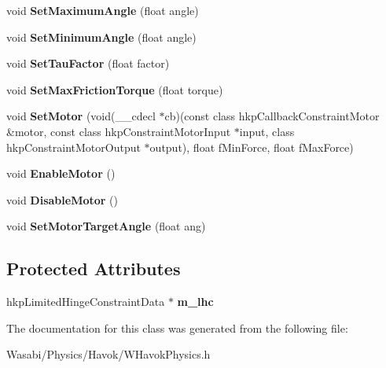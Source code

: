 \begin{DoxyCompactItemize}
\item 
void {\bfseries Set\+Maximum\+Angle} (float angle)\hypertarget{class_w_limited_hinge_a46782450f40d6a23b24eb43ba095c912}{}\label{class_w_limited_hinge_a46782450f40d6a23b24eb43ba095c912}

\item 
void {\bfseries Set\+Minimum\+Angle} (float angle)\hypertarget{class_w_limited_hinge_a5259add02a20a4f8fa0f758cc7bf2e76}{}\label{class_w_limited_hinge_a5259add02a20a4f8fa0f758cc7bf2e76}

\item 
void {\bfseries Set\+Tau\+Factor} (float factor)\hypertarget{class_w_limited_hinge_a75d6917491789b4929828ed719f40f0f}{}\label{class_w_limited_hinge_a75d6917491789b4929828ed719f40f0f}

\item 
void {\bfseries Set\+Max\+Friction\+Torque} (float torque)\hypertarget{class_w_limited_hinge_aa304dee708fe9be400088d3f9acedbc2}{}\label{class_w_limited_hinge_aa304dee708fe9be400088d3f9acedbc2}

\item 
void {\bfseries Set\+Motor} (void(\+\_\+\+\_\+cdecl $\ast$cb)(const class hkp\+Callback\+Constraint\+Motor \&motor, const class hkp\+Constraint\+Motor\+Input $\ast$input, class hkp\+Constraint\+Motor\+Output $\ast$output), float f\+Min\+Force, float f\+Max\+Force)\hypertarget{class_w_limited_hinge_a4c05bb7a53ef80e5505afc613599eb81}{}\label{class_w_limited_hinge_a4c05bb7a53ef80e5505afc613599eb81}

\item 
void {\bfseries Enable\+Motor} ()\hypertarget{class_w_limited_hinge_af57eda17cf2afa143a2d9b65cafa13d2}{}\label{class_w_limited_hinge_af57eda17cf2afa143a2d9b65cafa13d2}

\item 
void {\bfseries Disable\+Motor} ()\hypertarget{class_w_limited_hinge_a0d72d1dd34ee5431e8c799d83a9d40fc}{}\label{class_w_limited_hinge_a0d72d1dd34ee5431e8c799d83a9d40fc}

\item 
void {\bfseries Set\+Motor\+Target\+Angle} (float ang)\hypertarget{class_w_limited_hinge_a28d71d70cd50bed09540a77e3f50cc29}{}\label{class_w_limited_hinge_a28d71d70cd50bed09540a77e3f50cc29}

\end{DoxyCompactItemize}
\subsection*{Protected Attributes}
\begin{DoxyCompactItemize}
\item 
hkp\+Limited\+Hinge\+Constraint\+Data $\ast$ {\bfseries m\+\_\+lhc}\hypertarget{class_w_limited_hinge_a6f25ed08c2f11e3146aee6ddada72695}{}\label{class_w_limited_hinge_a6f25ed08c2f11e3146aee6ddada72695}

\end{DoxyCompactItemize}


The documentation for this class was generated from the following file\+:\begin{DoxyCompactItemize}
\item 
Wasabi/\+Physics/\+Havok/W\+Havok\+Physics.\+h\end{DoxyCompactItemize}

